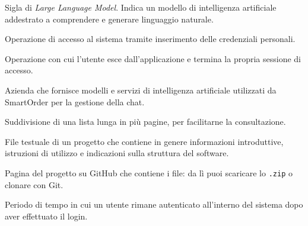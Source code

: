 Sigla di \textit{Large Language Model}. Indica un modello di intelligenza artificiale addestrato a comprendere e generare linguaggio naturale.

Operazione di accesso al sistema tramite inserimento delle credenziali personali.

Operazione con cui l'utente esce dall'applicazione e termina la propria sessione di accesso.

Azienda che fornisce modelli e servizi di intelligenza artificiale utilizzati da SmartOrder per la gestione della chat.

Suddivisione di una lista lunga in pi\`u pagine, per facilitarne la consultazione.

File testuale di un progetto che contiene in genere informazioni introduttive, istruzioni di utilizzo e indicazioni sulla struttura del software.

Pagina del progetto su GitHub che contiene i file: da lì puoi scaricare lo \texttt{.zip} o clonare con Git.

Periodo di tempo in cui un utente rimane autenticato all'interno del sistema dopo aver effettuato il login.